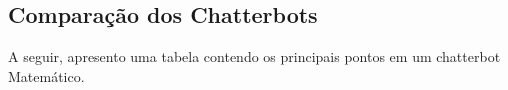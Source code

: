 \subsection{Comparação dos Chatterbots}\label{subsec:comparacao_dos_chatterbots}

A seguir, apresento uma tabela contendo os principais pontos em um chatterbot Matemático.

